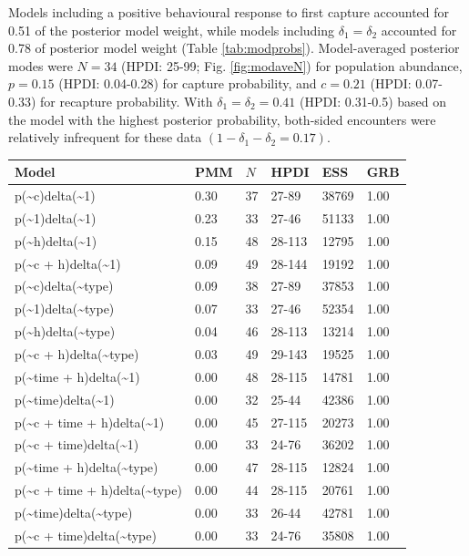 \documentclass[12pt]{article}
\begin{document}
Models including a positive behavioural response to first capture accounted for 0.51 of the posterior model weight, while models including $\delta_1=\delta_2$ accounted for 0.78 of posterior model weight (Table \ref{tab:modprobs}). Model-averaged posterior modes were $N=34$ (HPDI: 25-99; Fig. \ref{fig:modaveN}) for population abundance, $p=0.15$ (HPDI: 0.04-0.28) for capture probability, and $c=0.21$ (HPDI: 0.07-0.33) for recapture probability. With $\delta_1=\delta_2=0.41$ (HPDI: 0.31-0.5) based on the model with the highest posterior probability, both-sided encounters were relatively infrequent for these data $(1-\delta_1-\delta_2=0.17)$.
\begin{table}[ht]
\centering
\begin{tabular}{llllll}
  \hline
Model & PMM & $N$ & HPDI & ESS & GRB \\ 
  \hline
p(\~{}c)delta(\~{}1) & 0.30 & 37 & 27-89 & 38769 & 1.00 \\ 
  p(\~{}1)delta(\~{}1) & 0.23 & 33 & 27-46 & 51133 & 1.00 \\ 
  p(\~{}h)delta(\~{}1) & 0.15 & 48 & 28-113 & 12795 & 1.00 \\ 
  p(\~{}c + h)delta(\~{}1) & 0.09 & 49 & 28-144 & 19192 & 1.00 \\ 
  p(\~{}c)delta(\~{}type) & 0.09 & 38 & 27-89 & 37853 & 1.00 \\ 
  p(\~{}1)delta(\~{}type) & 0.07 & 33 & 27-46 & 52354 & 1.00 \\ 
  p(\~{}h)delta(\~{}type) & 0.04 & 46 & 28-113 & 13214 & 1.00 \\ 
  p(\~{}c + h)delta(\~{}type) & 0.03 & 49 & 29-143 & 19525 & 1.00 \\ 
  p(\~{}time + h)delta(\~{}1) & 0.00 & 48 & 28-115 & 14781 & 1.00 \\ 
  p(\~{}time)delta(\~{}1) & 0.00 & 32 & 25-44 & 42386 & 1.00 \\ 
  p(\~{}c + time + h)delta(\~{}1) & 0.00 & 45 & 27-115 & 20273 & 1.00 \\ 
  p(\~{}c + time)delta(\~{}1) & 0.00 & 33 & 24-76 & 36202 & 1.00 \\ 
  p(\~{}time + h)delta(\~{}type) & 0.00 & 47 & 28-115 & 12824 & 1.00 \\ 
  p(\~{}c + time + h)delta(\~{}type) & 0.00 & 44 & 28-115 & 20761 & 1.00 \\ 
  p(\~{}time)delta(\~{}type) & 0.00 & 33 & 26-44 & 42781 & 1.00 \\ 
  p(\~{}c + time)delta(\~{}type) & 0.00 & 33 & 24-76 & 35808 & 1.00 \\ 

\end{tabular}
\end{table}
\end{document}
